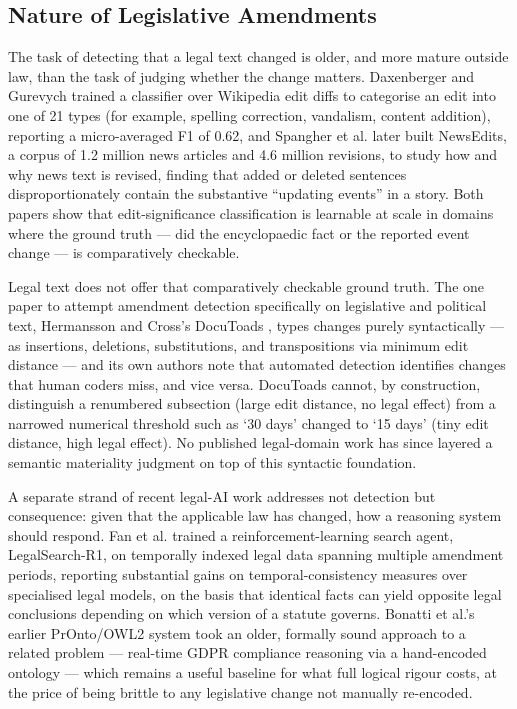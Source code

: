 \label{sec:2-6}

\subsection{Nature of Legislative Amendments}

\label{sec:2-6-1}

The task of detecting that a legal text changed is older, and more mature outside law, than the task of judging whether the change matters. Daxenberger and Gurevych \cite{daxenberger2013wikipedia} trained a classifier over Wikipedia edit diffs to categorise an edit into one of 21 types (for example, spelling correction, vandalism, content addition), reporting a micro-averaged F1 of 0.62, and Spangher et al. \cite{spangher2022newsedits} later built NewsEdits, a corpus of 1.2 million news articles and 4.6 million revisions, to study how and why news text is revised, finding that added or deleted sentences disproportionately contain the substantive “updating events” in a story. Both papers show that edit-significance classification is learnable at scale in domains where the ground truth — did the encyclopaedic fact or the reported event change — is comparatively checkable.

Legal text does not offer that comparatively checkable ground truth. The one paper to attempt amendment detection specifically on legislative and political text, Hermansson and Cross's DocuToads \cite{hermansson2016docutoads}, types changes purely syntactically — as insertions, deletions, substitutions, and transpositions via minimum edit distance — and its own authors note that automated detection identifies changes that human coders miss, and vice versa. DocuToads cannot, by construction, distinguish a renumbered subsection (large edit distance, no legal effect) from a narrowed numerical threshold such as ‘30 days’ changed to ‘15 days’ (tiny edit distance, high legal effect). No published legal-domain work has since layered a semantic materiality judgment on top of this syntactic foundation.

A separate strand of recent legal-AI work addresses not detection but consequence: given that the applicable law has changed, how a reasoning system should respond. Fan et al. \cite{fan2026legalsearchr1} trained a reinforcement-learning search agent, LegalSearch-R1, on temporally indexed legal data spanning multiple amendment periods, reporting substantial gains on temporal-consistency measures over specialised legal models, on the basis that identical facts can yield opposite legal conclusions depending on which version of a statute governs. Bonatti et al.'s earlier PrOnto/OWL2 system \cite{bonatti2020pronto} took an older, formally sound approach to a related problem — real-time GDPR compliance reasoning via a hand-encoded ontology — which remains a useful baseline for what full logical rigour costs, at the price of being brittle to any legislative change not manually re-encoded.

